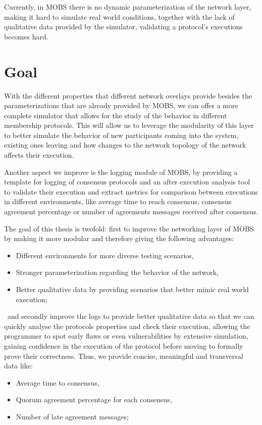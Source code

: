 Currently, in MOBS there is no dynamic parameterization of the network layer, making it hard to simulate real world conditions,
together with the lack of qualitative data provided by the simulator, validating a protocol's executions becomes hard.


\section{Goal}\label{sub:goal}

With the different properties that different network overlays provide besides the parameterizations that are already provided by MOBS,
we can offer a more complete simulator that allows for the study of the behavior in different membership protocols.
This will allow us to leverage the modularity of this layer to better simulate the behavior of new participants coming into the system, existing
ones leaving and how changes to the network topology of the network affects their execution.

Another aspect we improve is the logging module of MOBS, by providing a template for logging of consensus protocols and
an after execution analysis tool to validate their execution and extract metrics for
comparison between executions in different environments, like average time to reach consensus, consensus agreement percentage or
number of agreements messages received after consensus.


The goal of this thesis is twofold: first to improve the networking layer of MOBS by making it more modular and therefore giving the following advantages:
\begin{itemize}
  \item Different environments for more diverse testing scenarios,
  \item Stronger parameterization regarding the behavior of the network,
  \item Better qualitative data by providing scenarios that better mimic real world execution;
\end{itemize}

\noindent~and secondly improve the logs to provide better qualitative data so that we can quickly analyse the
protocols properties and check their execution, allowing the programmer to spot early flaws or even vulnerabilities
by extensive simulation, gaining confidence in the execution of the protocol before moving to formally prove their correctness. 
Thus, we provide concise, meaningful and transversal data like:
\begin{itemize}
  \item Average time to consensus,
  \item Quorum agreement percentage for each consensus,
  \item Number of late agreement messages;
\end{itemize}

